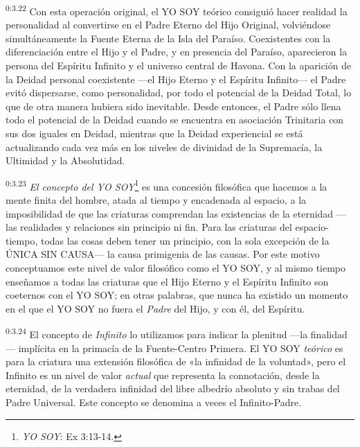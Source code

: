 \par
\textsuperscript{0:3.22} Con esta operación original, el YO SOY teórico consiguió hacer realidad la personalidad al convertirse en el Padre Eterno del Hijo Original, volviéndose simultáneamente la Fuente Eterna de la Isla del Paraíso. Coexistentes con la diferenciación entre el Hijo y el Padre, y en presencia del Paraíso, aparecieron la persona del Espíritu Infinito y el universo central de Havona. Con la aparición de la Deidad personal coexistente ---el Hijo Eterno y el Espíritu Infinito--- el Padre evitó dispersarse, como personalidad, por todo el potencial de la Deidad Total, lo que de otra manera hubiera sido inevitable. Desde entonces, el Padre sólo llena todo el potencial de la Deidad cuando se encuentra en asociación Trinitaria con sus dos iguales en Deidad, mientras que la Deidad experiencial se está actualizando cada vez más en los niveles de divinidad de la Supremacía, la Ultimidad y la Absolutidad.

\par
\textsuperscript{0:3.23} \textit{El concepto del YO SOY}\footnote{\textit{YO SOY}: Ex 3:13-14.} es una concesión filosófica que hacemos a la mente finita del hombre, atada al tiempo y encadenada al espacio, a la imposibilidad de que las criaturas comprendan las existencias de la eternidad ---las realidades y relaciones sin principio ni fin. Para las criaturas del espacio-tiempo, todas las cosas deben tener un principio, con la sola excepción de la ÚNICA SIN CAUSA--- la causa primigenia de las causas. Por este motivo conceptuamos este nivel de valor filosófico como el YO SOY, y al mismo tiempo enseñamos a todas las criaturas que el Hijo Eterno y el Espíritu Infinito son coeternos con el YO SOY; en otras palabras, que nunca ha existido un momento en el que el YO SOY no fuera el \textit{Padre} del Hijo, y con él, del Espíritu.

\par
\textsuperscript{0:3.24} El concepto de \textit{Infinito} lo utilizamos para indicar la plenitud ---la finalidad--- implícita en la primacía de la Fuente-Centro Primera. El YO SOY \textit{teórico} es para la criatura una extensión filosófica de «la infinidad de la voluntad», pero el Infinito es un nivel de valor \textit{actual} que representa la connotación, desde la eternidad, de la verdadera infinidad del libre albedrío absoluto y sin trabas del Padre Universal. Este concepto se denomina a veces el Infinito-Padre.

